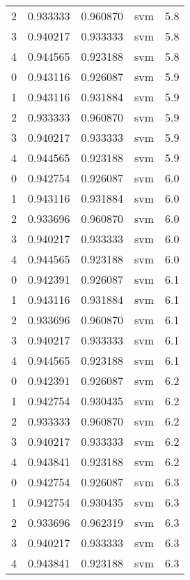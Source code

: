 \begin{tabular}{rrrlr}
     2 & 0.933333 & 0.960870 &      svm &        5.8 \\
     3 & 0.940217 & 0.933333 &      svm &        5.8 \\
     4 & 0.944565 & 0.923188 &      svm &        5.8 \\
     0 & 0.943116 & 0.926087 &      svm &        5.9 \\
     1 & 0.943116 & 0.931884 &      svm &        5.9 \\
     2 & 0.933333 & 0.960870 &      svm &        5.9 \\
     3 & 0.940217 & 0.933333 &      svm &        5.9 \\
     4 & 0.944565 & 0.923188 &      svm &        5.9 \\
     0 & 0.942754 & 0.926087 &      svm &        6.0 \\
     1 & 0.943116 & 0.931884 &      svm &        6.0 \\
     2 & 0.933696 & 0.960870 &      svm &        6.0 \\
     3 & 0.940217 & 0.933333 &      svm &        6.0 \\
     4 & 0.944565 & 0.923188 &      svm &        6.0 \\
     0 & 0.942391 & 0.926087 &      svm &        6.1 \\
     1 & 0.943116 & 0.931884 &      svm &        6.1 \\
     2 & 0.933696 & 0.960870 &      svm &        6.1 \\
     3 & 0.940217 & 0.933333 &      svm &        6.1 \\
     4 & 0.944565 & 0.923188 &      svm &        6.1 \\
     0 & 0.942391 & 0.926087 &      svm &        6.2 \\
     1 & 0.942754 & 0.930435 &      svm &        6.2 \\
     2 & 0.933333 & 0.960870 &      svm &        6.2 \\
     3 & 0.940217 & 0.933333 &      svm &        6.2 \\
     4 & 0.943841 & 0.923188 &      svm &        6.2 \\
     0 & 0.942754 & 0.926087 &      svm &        6.3 \\
     1 & 0.942754 & 0.930435 &      svm &        6.3 \\
     2 & 0.933696 & 0.962319 &      svm &        6.3 \\
     3 & 0.940217 & 0.933333 &      svm &        6.3 \\
     4 & 0.943841 & 0.923188 &      svm &        6.3 \\

\end{tabular}
